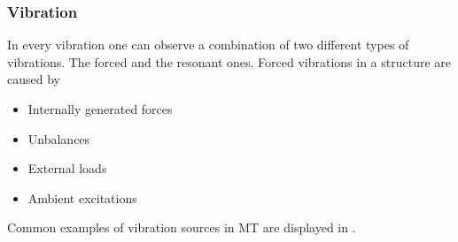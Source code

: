 \subsubsection{Vibration}

In every vibration one can observe a combination of two different types of vibrations. The forced and the resonant ones. Forced vibrations in a structure are caused by
\begin{itemize}
  \item Internally generated forces
  \item Unbalances
  \item External loads
  \item Ambient excitations
\end{itemize}
Common examples of vibration sources in \ac{MT} are displayed in .

